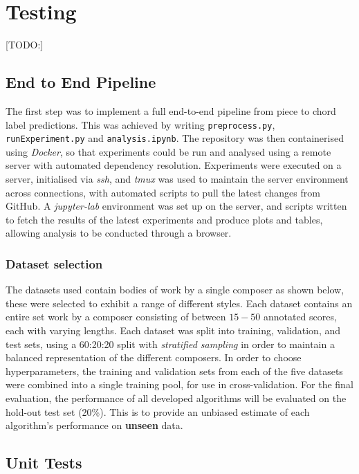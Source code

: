 \documentclass[12pt,a4paper,twoside,openany]{report} \usepackage[pdfborder={0 0 0}]{hyperref}    %
\theoremstyle{definition} \newtheorem{definition}{Definition}[section]
\begin{document}
  \section{Testing}
  [TODO:]
  \label{sec:testing}

  \subsection{End to End Pipeline} The first step was to implement a full end-to-end pipeline from piece to chord label
  predictions. This was achieved by writing \texttt{preprocess.py}, \texttt{runExperiment.py} and
  \texttt{analysis.ipynb}. The repository was then containerised using \textit{Docker}, so that experiments could be
  run and analysed using a remote server with automated dependency resolution. Experiments were executed on
  a server, initialised via \textit{ssh}, and \textit{tmux} was used to maintain the server environment across
  connections, with automated scripts to pull the latest changes from GitHub. A \textit{jupyter-lab} environment was
  set up on the server, and scripts written to fetch the results of the latest experiments and produce plots and
  tables, allowing analysis to be conducted through a browser. \subsubsection{Dataset selection}

  The datasets used contain bodies of work by a single composer as shown below, these were selected to exhibit
  a range of different styles. Each dataset contains an entire set work by a composer consisting of between $15-50$
  annotated scores, each with varying lengths. Each dataset was split into training, validation, and test sets,
  using a 60:20:20 split with \textit{stratified sampling} in order to maintain a balanced representation of the
  different composers. In order to choose hyperparameters, the training and validation sets from each of the five
  datasets were combined into a single training pool, for use in cross-validation. For the final evaluation, the
  performance of all developed algorithms will be evaluated on the hold-out test set (20\%). This is to provide an
  unbiased estimate of each algorithm's performance on \textbf{unseen} data.


  \subsection{Unit Tests}
  \label{sub:unittests}
\end{document}
